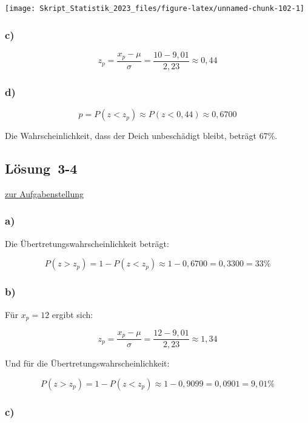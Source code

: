 \documentclass[
  11pt,
  ngerman,
  a4paper,
]{report}
\begin{document}
\begin{center}\texttt{[image: Skript\_Statistik\_2023\_files/figure-latex/unnamed-chunk-102-1]} \end{center}

\hypertarget{c-8}{%
\subsubsection{c)}\label{c-8}}

\[z_p=\frac{x_p- \mu}{\sigma} = \frac{10-9,01}{2,23}\approx0,44\]

\hypertarget{d-3}{%
\subsubsection{d)}\label{d-3}}

\[p=P(z<z_p)\approx P(z<0,44)\approx0,6700\]

Die Wahrscheinlichkeit, dass der Deich unbeschädigt bleibt, beträgt 67\%.

\hypertarget{loesung-3-4}{%
\subsection{Lösung~3-4}\label{loesung-3-4}}

\protect\hyperlink{aufgabe-3-4}{zur Aufgabenstellung}

\hypertarget{a-11}{%
\subsubsection{a)}\label{a-11}}

Die Übertretungswahrscheinlichkeit beträgt:

\[P(z>z_p) = 1- P(z<z_p) \approx 1-0,6700 = 0,3300 = 33\% \]

\hypertarget{b-11}{%
\subsubsection{b)}\label{b-11}}

Für \(x_p=12\) ergibt sich:

\[ z_p=\frac{x_p- \mu}{\sigma} = \frac{12-9,01}{2,23}\approx1,34 \]

Und für die Übertretungswahrscheinlichkeit:

\[P(z>z_p) = 1- P(z<z_p) \approx 1-0,9099 = 0,0901= 9,01\% \]

\hypertarget{c-9}{%
\subsubsection{c)}\label{c-9}}
\end{document}
